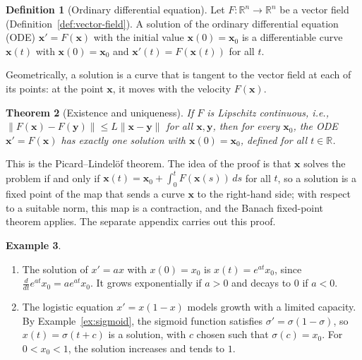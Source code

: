 \documentclass[11pt]{article}
\newcommand{\norm}[1]{\lVert #1 \rVert}
\theoremstyle{definition}
\newtheorem{definition}{Definition}[section]
\newtheorem{example}[definition]{Example}
\theoremstyle{plain}
\newtheorem{theorem}[definition]{Theorem}
\theoremstyle{remark}
\begin{document}
\begin{definition}[Ordinary differential equation]\label{def:ode}
    Let $F: \mathbb{R}^n \to \mathbb{R}^n$ be a vector field (Definition~\ref{def:vector-field}). A solution of the ordinary differential equation (ODE) $\mathbf{x}' = F(\mathbf{x})$ with the initial value $\mathbf{x}(0) = \mathbf{x}_0$ is a differentiable curve $\mathbf{x}(t)$ with $\mathbf{x}(0) = \mathbf{x}_0$ and $\mathbf{x}'(t) = F(\mathbf{x}(t))$ for all $t$.
\end{definition}

Geometrically, a solution is a curve that is tangent to the vector field at each of its points: at the point $\mathbf{x}$, it moves with the velocity $F(\mathbf{x})$.

\begin{theorem}[Existence and uniqueness]\label{thm:picard}
    If $F$ is Lipschitz continuous, i.e., $\norm{F(\mathbf{x}) - F(\mathbf{y})} \leq L\norm{\mathbf{x} - \mathbf{y}}$ for all $\mathbf{x}, \mathbf{y}$, then for every $\mathbf{x}_0$, the ODE $\mathbf{x}' = F(\mathbf{x})$ has exactly one solution with $\mathbf{x}(0) = \mathbf{x}_0$, defined for all $t \in \mathbb{R}$.
\end{theorem}

This is the Picard--Lindel\"of theorem. The idea of the proof is that $\mathbf{x}$ solves the problem if and only if $\mathbf{x}(t) = \mathbf{x}_0 + \int_0^t F(\mathbf{x}(s))\, ds$ for all $t$, so a solution is a fixed point of the map that sends a curve $\mathbf{x}$ to the right-hand side; with respect to a suitable norm, this map is a contraction, and the Banach fixed-point theorem applies. The separate appendix carries out this proof.

\begin{example}\label{ex:scalar-ode}
    \begin{enumerate}
        \item The solution of $x' = ax$ with $x(0) = x_0$ is $x(t) = e^{at}x_0$, since $\frac{d}{dt}e^{at}x_0 = ae^{at}x_0$. It grows exponentially if $a > 0$ and decays to $0$ if $a < 0$.
        \item The logistic equation $x' = x(1 - x)$ models growth with a limited capacity. By Example~\ref{ex:sigmoid}, the sigmoid function satisfies $\sigma' = \sigma(1 - \sigma)$, so $x(t) = \sigma(t + c)$ is a solution, with $c$ chosen such that $\sigma(c) = x_0$. For $0 < x_0 < 1$, the solution increases and tends to $1$.
    \end{enumerate}
\end{example}
\end{document}
